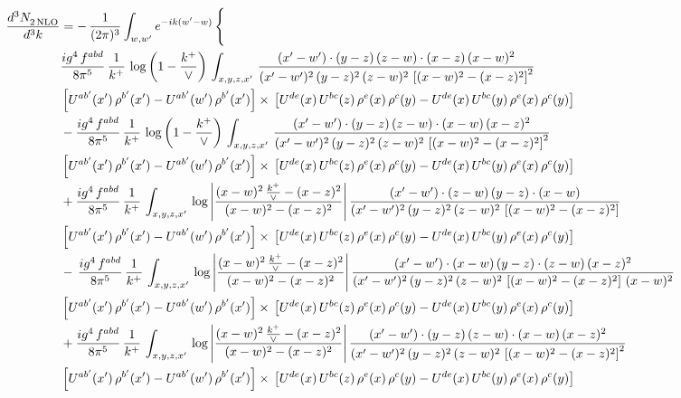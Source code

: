 \documentclass[9pt]{article}
\numberwithin{equation}{section}
\begin{document}
\begin{align}
   \frac{d^{3}N_{2\,\rm NLO}^{\rm}}{d^{3}k}  & =  -\,\frac{1}{(2\pi)^{3}}  \int_{w, w^\prime} e^{-ik(w^\prime-w)}\, \Bigg\{\notag \\ &  \frac{ig^{4}\, f^{abd}}{8\pi^{5}}\, \frac{1}{k^{+}}\,\log{\left(1-\frac{k^{+}}{\vee}\right)}\, \int_{x,y,z,x'}\,\frac{(x'-w')\cdot  (y-z)\, (z-w)\cdot (x-z)\, (x-w)^{2}}{(x'-w')^{2}\, (y-z)^{2}\, (z-w)^{2}\,\left[(x-w)^{2}-(x-z)^{2}\right]^{2}}\, \notag \\ & \left[U^{ab'}(x')\,\rho^{b'}(x')-U^{ab'}(w')\, \rho^{b'}(x')\right]\times\,\left[U^{de}(x)\,U^{bc}(z)\, \rho^{e}(x)\,\rho^{c}(y)-U^{de}(x)\,U^{bc}(y)\,\rho^{e}(x)\,\rho^{c}(y)\right] \notag \\ &   - \frac{ig^{4}\, f^{abd}}{8\pi^{5}}\, \frac{1}{k^{+}}\,\log{\left(1-\frac{k^{+}}{\vee}\right)}\, \int_{x,y,z,x'}\,\frac{(x'-w')\cdot  (y-z)\, (z-w)\cdot (x-w)\, (x-z)^{2}}{(x'-w')^{2}\, (y-z)^{2}\, (z-w)^{2}\,\left[(x-w)^{2}-(x-z)^{2}\right]^{2}}\, \notag \\ & \left[U^{ab'}(x')\,\rho^{b'}(x')-U^{ab'}(w')\, \rho^{b'}(x')\right]\times\,\left[U^{de}(x)\,U^{bc}(z)\, \rho^{e}(x)\,\rho^{c}(y)-U^{de}(x)\,U^{bc}(y)\,\rho^{e}(x)\,\rho^{c}(y)\right] \notag \\
&  + \frac{ig^{4}\, f^{abd}}{8\pi^{5}}\, \frac{1}{k^{+}}\, \int_{x,y,z,x'}\,\log{\left|\frac{(x-w)^{2}\,\frac{k^{+}}{\vee}-(x-z)^{2}}{(x-w)^{2}-(x-z)^{2}}\right|}\,\frac{(x'-w')\cdot (z-w)\, (y-z)\cdot (x-w)}{(x'-w')^{2}\, (y-z)^{2}\, (z-w)^{2}\,\left[(x-w)^{2}-(x-z)^{2}\right]}\, \notag \\ & \left[U^{ab'}(x')\,\rho^{b'}(x')-U^{ab'}(w')\, \rho^{b'}(x')\right]\times\,\left[U^{de}(x)\,U^{bc}(z)\, \rho^{e}(x)\,\rho^{c}(y)-U^{de}(x)\,U^{bc}(y)\,\rho^{e}(x)\,\rho^{c}(y)\right] \notag \\
& -\,\frac{ig^{4}\, f^{abd}}{8\pi^{5}}\, \frac{1}{k^{+}}\, \int_{x,y,z,x'}\,\log{\left|\frac{(x-w)^{2}\,\frac{k^{+}}{\vee}-(x-z)^{2}}{(x-w)^{2}-(x-z)^{2}}\right|}\,\frac{(x'-w')\cdot (x-w)\, (y-z)\cdot(z-w)\,(x-z)^{2}}{(x'-w')^{2}\, (y-z)^{2}\, (z-w)^{2}\,\left[(x-w)^{2}-(x-z)^{2}\right]\,(x-w)^{2}}\, \notag \\ & \left[U^{ab'}(x')\,\rho^{b'}(x')-U^{ab'}(w')\, \rho^{b'}(x')\right]\times\,\left[U^{de}(x)\,U^{bc}(z)\, \rho^{e}(x)\,\rho^{c}(y)-U^{de}(x)\,U^{bc}(y)\,\rho^{e}(x)\,\rho^{c}(y)\right] \notag \\
& +\frac{ig^{4}\, f^{abd}}{8\pi^{5}}\, \frac{1}{k^{+}}\, \int_{x,y,z,x'}\,\log{\left|\frac{(x-w)^{2}\,\frac{k^{+}}{\vee}-(x-z)^{2}}{(x-w)^{2}-(x-z)^{2}}\right|}\,\frac{(x'-w')\cdot  (y-z)\, (z-w)\cdot (x-w)\, (x-z)^{2}}{(x'-w')^{2}\, (y-z)^{2}\, (z-w)^{2}\,\left[(x-w)^{2}-(x-z)^{2}\right]^{2}}\, \notag \\ & \left[U^{ab'}(x')\,\rho^{b'}(x')-U^{ab'}(w')\, \rho^{b'}(x')\right]\times\,\left[U^{de}(x)\,U^{bc}(z)\, \rho^{e}(x)\,\rho^{c}(y)-U^{de}(x)\,U^{bc}(y)\,\rho^{e}(x)\,\rho^{c}(y)\right] \notag \\

\end{align}
\end{document}
